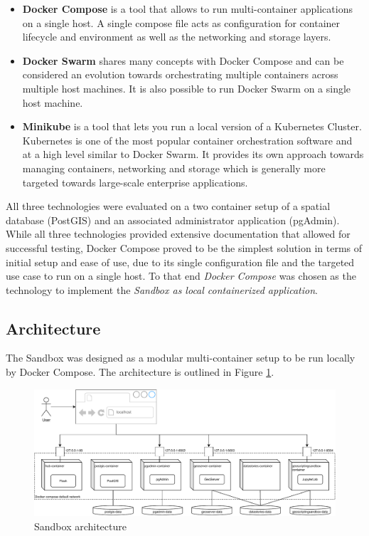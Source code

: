 \documentclass[11pt, a4paper, oneside, parskip=full-]{scrartcl}
\begin{document}
\begin{itemize}
  \item \textbf{Docker Compose}\cite{dockercompose} is a tool that allows to run
  multi-container applications on a single host. A single compose file acts as
  configuration for container lifecycle and environment as well as the
  networking and storage layers.
  \item \textbf{Docker Swarm}\cite{dockerswarm} shares many concepts with Docker
  Compose and can be considered an evolution towards orchestrating multiple
  containers across multiple host machines. It is also possible to run Docker
  Swarm on a single host machine.
  \item \textbf{Minikube}\cite{minikube} is a tool that lets you run a local
  version of a Kubernetes Cluster. Kubernetes is one of the most popular
  container orchestration software and at a high level similar to Docker Swarm.
  It provides its own approach towards managing containers, networking and
  storage which is generally more targeted towards large-scale enterprise
  applications.
\end{itemize}

All three technologies were evaluated on a two container setup of a spatial
database (PostGIS) and an associated administrator application (pgAdmin). While
all three technologies provided extensive documentation that allowed for
successful testing, Docker Compose proved to be the simplest solution in terms
of initial setup and ease of use, due to its single configuration file and the
targeted use case to run on a single host. To that end \emph{Docker Compose} was
chosen as the technology to implement the \emph{Sandbox as local containerized
application}.


\subsection{Architecture}
The Sandbox was designed as a modular multi-container setup to be run locally by
Docker Compose. The architecture is outlined in Figure \ref{fig:sandboxsetup}.

\begin{figure}[H]
  \centering
  \includegraphics[width=1\textwidth]{composeSetup}
  \caption{Sandbox architecture}
  \label{fig:sandboxsetup}
\end{figure}
\end{document}
